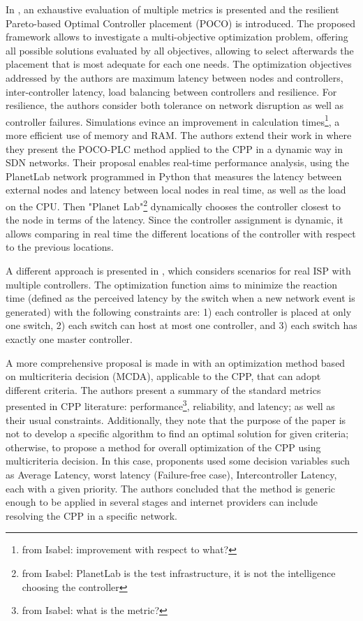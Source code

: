 \documentclass{IEEEtran}
\newcommand\fia[1]{{\color{red}\footnote{\color{red}from Isabel: #1}}} %
\newcommand\delia[1]{{\tiny{\color{red}#1}}} %
\begin{document}
In \cite{HoHa13}, an exhaustive evaluation of multiple metrics is presented and the resilient Pareto-based Optimal Controller placement (POCO) is introduced. The proposed framework allows to investigate a multi-objective optimization problem, offering all possible solutions evaluated by all objectives, allowing to select afterwards the placement that is most adequate for each one needs. The optimization objectives addressed by the authors are maximum latency between nodes and controllers, inter-controller latency, load balancing between controllers and resilience. For resilience, the authors consider both tolerance on network disruption as well as controller failures. Simulations evince an improvement in calculation times\fia{improvement with respect to what?}, a more efficient use of memory and RAM. The authors extend their work in \cite{HoHa14} where they present the POCO-PLC method applied to the CPP in a dynamic way in SDN networks. Their proposal enables real-time performance analysis, using the PlanetLab network programmed in Python that measures the latency between external nodes and latency between local nodes in real time, as well as the load on the CPU. Then "Planet Lab"\fia{PlanetLab is the test infrastructure, it is not the intelligence choosing the controller} dynamically chooses the controller closest to the node in terms of the latency. Since the controller assignment is dynamic, it allows comparing in real time the different locations of the controller with respect to the previous locations.

A different approach is presented in \cite{ZhGi17}, which considers scenarios for real ISP with multiple controllers. The optimization function aims to minimize the reaction time (defined as the perceived latency by the switch when a new network event is generated) with the following constraints \delia{are}: 1) each controller is placed at only one switch, 2) each switch can host at most one controller, and 3) each switch has exactly one master controller. %

A more comprehensive proposal is made in \cite{VoBo15} with an optimization method based on multicriteria decision (MCDA), applicable to the CPP, that can adopt different criteria. The authors present a summary of the standard metrics presented in CPP literature: performance\fia{what is the metric?}, reliability, and latency; as well as their usual constraints. Additionally, they note that the purpose of the paper is not to develop a specific algorithm to find an optimal solution for given criteria; otherwise, to propose a method for overall optimization of the CPP using multicriteria decision. In this case, proponents used some decision variables such as Average Latency, worst latency (Failure-free case), Intercontroller Latency,  each with a given priority. The authors concluded that the method is generic enough to be applied in several stages and internet providers can include resolving the CPP in a specific network. 
\end{document}
